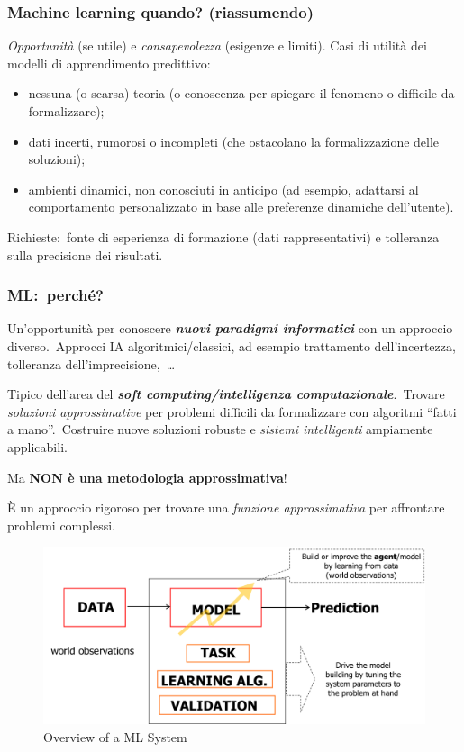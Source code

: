 \subsubsection{Machine learning quando? (riassumendo)}
\textit{Opportunità} (se utile) e \textit{consapevolezza} (esigenze e limiti).
Casi di utilità dei modelli di apprendimento predittivo:
\begin{itemize}
	\item nessuna (o scarsa) teoria (o conoscenza per spiegare il fenomeno o difficile da formalizzare);
	\item dati incerti, rumorosi o incompleti (che ostacolano la formalizzazione delle soluzioni);
	\item ambienti dinamici, non conosciuti in anticipo (ad esempio, adattarsi al comportamento personalizzato in base alle preferenze dinamiche dell'utente).
\end{itemize}

\noindent Richieste:\ fonte di esperienza di formazione (dati rappresentativi) e tolleranza sulla precisione dei risultati.

\subsubsection{ML:\ perché?}

Un'opportunità per conoscere \textbf{\textit{nuovi paradigmi informatici}} con un approccio diverso.\
Approcci IA algoritmici/classici, ad esempio trattamento dell'incertezza, tolleranza dell'imprecisione,\ \dots

\noindent Tipico dell'area del \textbf{\textit{soft computing/intelligenza computazionale}}.\
Trovare \textit{soluzioni approssimative} per problemi difficili da formalizzare con algoritmi ``fatti a mano''.\
Costruire nuove soluzioni robuste e \textit{sistemi intelligenti} ampiamente applicabili.

\begin{center}
	Ma \textbf{NON è una metodologia approssimativa}!
\end{center}

\noindent È un approccio rigoroso per trovare una \textit{funzione approssimativa} per affrontare problemi complessi.

\begin{figure}[H]
	\centering
	\includegraphics[width=\textwidth]{immagini/machine_learning.png}
	\caption*{Overview of a ML System}
\end{figure}

